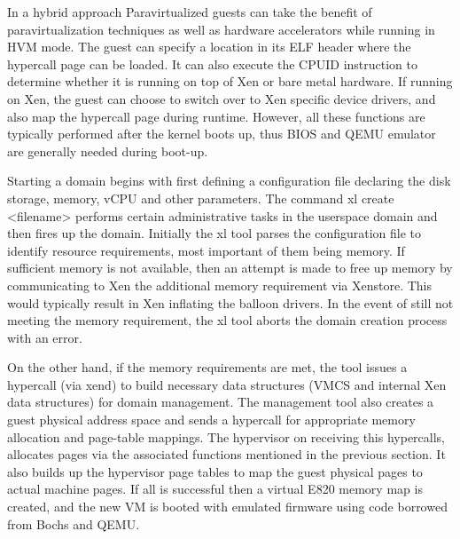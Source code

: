  

In a hybrid approach Paravirtualized guests can take the benefit of paravirtualization techniques as well as hardware accelerators while running in HVM mode. The guest can specify a location in its ELF header where the hypercall page can be loaded. It can also execute the CPUID instruction to determine whether it is running on top of Xen or bare metal hardware. If running on Xen, the guest can choose to switch over to Xen specific device drivers, and also map the hypercall page during runtime. However, all these functions are typically performed after the kernel boots up, thus BIOS and QEMU emulator are generally needed during boot-up. 

 

Starting a domain begins with first defining a configuration file declaring the disk storage, memory, vCPU and other parameters. The command xl create <filename> performs certain administrative tasks in the userspace domain and then fires up the domain. Initially the xl tool parses the configuration file to identify resource requirements, most important of them being memory. If sufficient memory is not available, then an attempt is made to free up memory by communicating to Xen the additional memory requirement via Xenstore. This would typically result in Xen inflating the balloon drivers. In the event of still not meeting the memory requirement, the xl tool aborts the domain creation process with an error.  

 

On the other hand, if the memory requirements are met, the tool issues a hypercall (via xend) to build necessary data structures (VMCS and internal Xen data structures) for domain management. The management tool also creates a guest physical address space and sends a hypercall for appropriate memory allocation and page-table mappings. The hypervisor on receiving this hypercalls, allocates pages via the associated functions mentioned in the previous section. It also builds up the hypervisor page tables to map the guest physical pages to actual machine pages. If all is successful then a virtual E820 memory map is created, and the new VM is booted with emulated firmware using code borrowed from Bochs and QEMU.  

